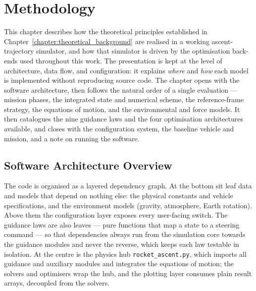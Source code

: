 \chapter{Methodology}
\label{chapter:methodology}

This chapter describes how the theoretical principles established in
Chapter~\ref{chapter:theoretical_background} are realised in a working ascent-trajectory
simulator, and how that simulator is driven by the optimisation back-ends used
throughout this work. The presentation is kept at the level of architecture,
data flow, and configuration: it explains \emph{where} and \emph{how} each model
is implemented without reproducing source code. The chapter opens with the
software architecture, then follows the natural order of a single evaluation ---
mission phases, the integrated state and numerical scheme, the reference-frame
strategy, the equations of motion, and the environmental and force models. It
then catalogues the nine guidance laws and the four optimisation architectures
available, and closes with the configuration system, the baseline vehicle and
mission, and a note on running the software.

\section{Software Architecture Overview}
\label{sec:architecture}

The code is organised as a layered dependency graph. At the bottom sit leaf data
and models that depend on nothing else: the physical constants and vehicle
specifications, and the environment models (gravity, atmosphere, Earth rotation).
Above them the configuration layer exposes every user-facing switch. The guidance
laws are also leaves --- pure functions that map a state to a steering command ---
so that dependencies always run from the simulation core towards the guidance
modules and never the reverse, which keeps each law testable in isolation. At the
centre is the physics hub \texttt{rocket\_ascent.py}, which imports all guidance
and auxiliary modules and integrates the equations of motion; the solvers and
optimisers wrap the hub, and the plotting layer consumes plain result arrays,
decoupled from the solvers.

